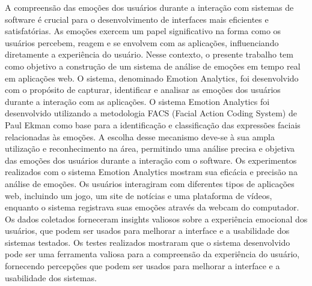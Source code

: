 \begin{resumo-portugues}
  
  \noindent A compreensão das emoções dos usuários durante a interação com sistemas de software é crucial para o desenvolvimento de interfaces mais eficientes e satisfatórias. As emoções exercem um papel significativo na forma como os usuários percebem, reagem e se envolvem com as aplicações, influenciando diretamente a experiência do usuário. Nesse contexto, o presente trabalho tem como objetivo a construção de um sistema de análise de emoções em tempo real em aplicações web. O sistema, denominado Emotion Analytics, foi desenvolvido com o propósito de capturar, identificar e analisar as emoções dos usuários durante a interação com as aplicações. O sistema Emotion Analytics foi desenvolvido utilizando a metodologia FACS (Facial Action Coding System) de Paul Ekman como base para a identificação e classificação das expressões faciais relacionadas às emoções. A escolha desse mecanismo deve-se à sua ampla utilização e reconhecimento na área, permitindo uma análise precisa e objetiva das emoções dos usuários durante a interação com o software. Os experimentos realizados com o sistema Emotion Analytics mostram sua eficácia e precisão na análise de emoções. Os usuários interagiram com diferentes tipos de aplicações web, incluindo um jogo, um site de notícias e uma plataforma de vídeos, enquanto o sistema registrava suas emoções através da webcam do computador. Os dados coletados forneceram insights valiosos sobre a experiência emocional dos usuários, que podem ser usados para melhorar a interface e a usabilidade dos sistemas testados. Os testes realizados mostraram que o sistema desenvolvido pode ser uma ferramenta valiosa para a compreensão da experiência do usuário, fornecendo percepções que podem ser usados para melhorar a interface e a usabilidade dos sistemas.


\end{resumo-portugues}
